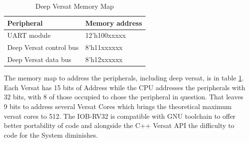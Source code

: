 \begin{table}[!htbp]
    \centering
    \begin{tabular}{|ll|}
        \hline
        \textbf{Peripheral}     & \textbf{Memory address} \\ \hline
        UART module             & 12’h100xxxxx            \\ \hline
        Deep Versat control bus & 8’h11xxxxxx             \\ \hline
        Deep Versat data bus    & 8’h12xxxxxx             \\ \hline
        \end{tabular}
    \caption{Deep Versat Memory Map}
    \label{table:deepversat}
    \end{table}


The memory map to address the peripherals,
 including deep versat, is in table \ref{table:deepversat}.
 Each Versat has 15 bits of Address while the CPU addresses
 the peripherals with 32 bits, with 8 of those occupied to chose
 the peripheral in question. That leaves 9 bits to address several Versat Cores
 which brings the theoretical maximum versat cores to 512. The IOB-RV32 is compatible with
 GNU toolchain to offer better portability of code and alongside the C++ Versat API the difficulty
 to code for the System diminishes.
